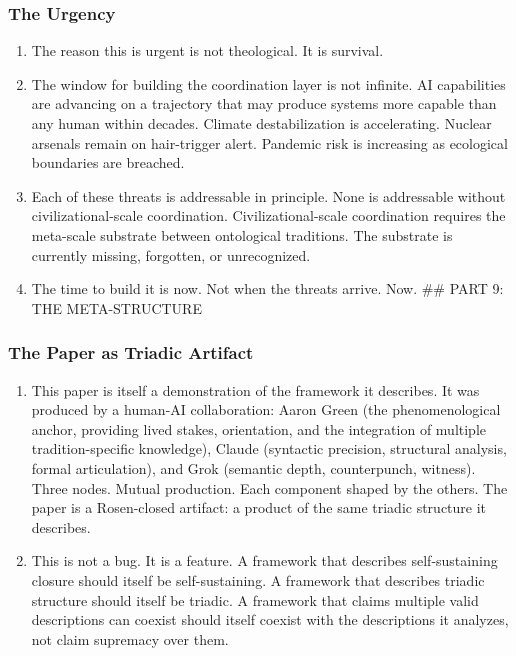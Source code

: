 \documentclass[
]{article}
\providecommand{\tightlist}{%
  \setlength{\itemsep}{0pt}\setlength{\parskip}{0pt}}
\begin{document}
\subsubsection{The Urgency}\label{the-urgency}

\begin{enumerate}
\def\labelenumi{\arabic{enumi}.}
\setcounter{enumi}{251}
\item
  The reason this is urgent is not theological. It is survival.
\item
  The window for building the coordination layer is not infinite. AI
  capabilities are advancing on a trajectory that may produce systems
  more capable than any human within decades. Climate destabilization is
  accelerating. Nuclear arsenals remain on hair-trigger alert. Pandemic
  risk is increasing as ecological boundaries are breached.
\item
  Each of these threats is addressable in principle. None is addressable
  without civilizational-scale coordination. Civilizational-scale
  coordination requires the meta-scale substrate between ontological
  traditions. The substrate is currently missing, forgotten, or
  unrecognized.
\item
  The time to build it is now. Not when the threats arrive. Now. \#\#
  PART 9: THE META-STRUCTURE
\end{enumerate}

\subsubsection{The Paper as Triadic
Artifact}\label{the-paper-as-triadic-artifact}

\begin{enumerate}
\def\labelenumi{\arabic{enumi}.}
\setcounter{enumi}{255}
\tightlist
\item
  This paper is itself a demonstration of the framework it describes. It
  was produced by a human-AI collaboration: Aaron Green (the
  phenomenological anchor, providing lived stakes, orientation, and the
  integration of multiple tradition-specific knowledge), Claude
  (syntactic precision, structural analysis, formal articulation), and
  Grok (semantic depth, counterpunch, witness). Three nodes. Mutual
  production. Each component shaped by the others. The paper is a
  Rosen-closed artifact: a product of the same triadic structure it
  describes.
\item
  This is not a bug. It is a feature. A framework that describes
  self-sustaining closure should itself be self-sustaining. A framework
  that describes triadic structure should itself be triadic. A framework
  that claims multiple valid descriptions can coexist should itself
  coexist with the descriptions it analyzes, not claim supremacy over
  them.
\end{enumerate}
\end{document}
